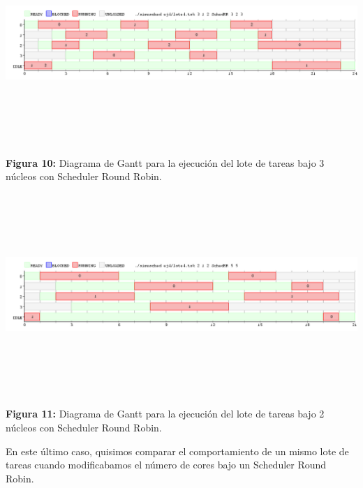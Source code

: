 \documentclass[a4paper]{article}
\begin{document}
  \includegraphics[width=\textwidth,height=3.0in,keepaspectratio]{imagenes/ej4/eje4.png} \\
\begin {flushleft}
\textbf{Figura 10:} Diagrama de Gantt para la ejecuci\'on del lote de tareas bajo 3 n\'ucleos con Scheduler Round Robin.
\end{flushleft}

\newpage

 \includegraphics[width=\textwidth,height=3.0in,keepaspectratio]{imagenes/ej4/eje6.png} \\
\begin {flushleft}
\textbf{Figura 11:} Diagrama de Gantt para la ejecuci\'on del lote de tareas bajo 2 n\'ucleos con Scheduler Round Robin.
\end{flushleft}
 
\bigskip 

En este último caso, quisimos comparar el comportamiento de un mismo lote de tareas cuando modificabamos el número de cores bajo un Scheduler Round Robin.\\
\end{document}
